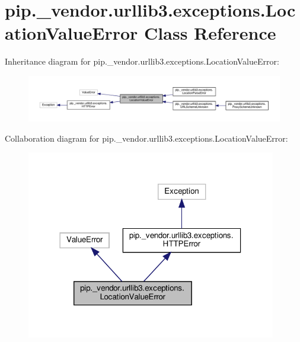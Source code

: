 \hypertarget{classpip_1_1__vendor_1_1urllib3_1_1exceptions_1_1LocationValueError}{}\section{pip.\+\_\+vendor.\+urllib3.\+exceptions.\+Location\+Value\+Error Class Reference}
\label{classpip_1_1__vendor_1_1urllib3_1_1exceptions_1_1LocationValueError}


Inheritance diagram for pip.\+\_\+vendor.\+urllib3.\+exceptions.\+Location\+Value\+Error\+:
\nopagebreak
\begin{figure}[H]
\begin{center}
\leavevmode
\includegraphics[width=350pt]{classpip_1_1__vendor_1_1urllib3_1_1exceptions_1_1LocationValueError__inherit__graph}
\end{center}
\end{figure}


Collaboration diagram for pip.\+\_\+vendor.\+urllib3.\+exceptions.\+Location\+Value\+Error\+:
\nopagebreak
\begin{figure}[H]
\begin{center}
\leavevmode
\includegraphics[width=309pt]{classpip_1_1__vendor_1_1urllib3_1_1exceptions_1_1LocationValueError__coll__graph}
\end{center}
\end{figure}


